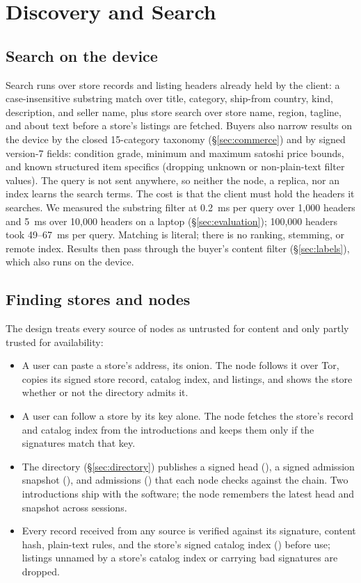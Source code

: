 \section{Discovery and Search}
\label{sec:discovery}

\subsection{Search on the device}

Search runs over store records and listing headers already held by the client: a case-insensitive substring match over title, category, ship-from country, kind, description, and seller name, plus store search over store name, region, tagline, and about text before a store's listings are fetched. Buyers also narrow results on the device by the closed 15-category taxonomy (\S\ref{sec:commerce}) and by signed version-7 fields: condition grade, minimum and maximum satoshi price bounds, and known structured item specifics (dropping unknown or non-plain-text filter values). The query is not sent anywhere, so neither the node, a replica, nor an index learns the search terms. The cost is that the client must hold the headers it searches. We measured the substring filter at 0.2~ms per query over 1{,}000 headers and 5~ms over 10{,}000 headers on a laptop (\S\ref{sec:evaluation}); 100{,}000 headers took 49--67~ms per query. Matching is literal; there is no ranking, stemming, or remote index. Results then pass through the buyer's content filter (\S\ref{sec:labels}), which also runs on the device.

\subsection{Finding stores and nodes}

The design treats every source of nodes as untrusted for content and only partly trusted for availability:
\begin{itemize}
  \item A user can paste a store's address, its onion. The node follows it over Tor, copies its signed store record, catalog index, and listings, and shows the store whether or not the directory admits it.
  \item A user can follow a store by its key alone. The node fetches the store's record and catalog index from the introductions and keeps them only if the signatures match that key.
  \item The directory (\S\ref{sec:directory}) publishes a signed head (), a signed admission snapshot (), and admissions () that each node checks against the chain. Two introductions ship with the software; the node remembers the latest head and snapshot across sessions.
  \item Every record received from any source is verified against its signature, content hash, plain-text rules, and the store's signed catalog index () before use; listings unnamed by a store's catalog index or carrying bad signatures are dropped.
\end{itemize}

